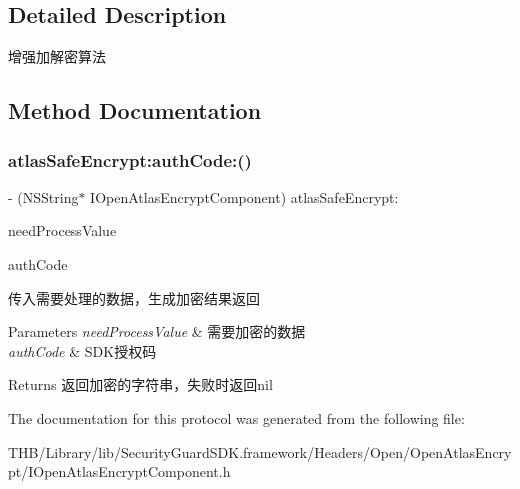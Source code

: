 \subsection{Detailed Description}
增强加解密算法 

\subsection{Method Documentation}
\mbox{\label{protocol_i_open_atlas_encrypt_component_01-p_a04c89f6ec9e95172f1bd3ee2ab100a72}} 
\subsubsection{\texorpdfstring{atlas\+Safe\+Encrypt\+:auth\+Code\+:()}{atlasSafeEncrypt:authCode:()}}
{\footnotesize\ttfamily -\/ (N\+S\+String$\ast$ I\+Open\+Atlas\+Encrypt\+Component) atlas\+Safe\+Encrypt\+: \begin{DoxyParamCaption}\item[{(N\+S\+String $\ast$)}]{need\+Process\+Value }\item[{authCode:(N\+S\+String $\ast$)}]{auth\+Code }\end{DoxyParamCaption}}

传入需要处理的数据，生成加密结果返回


\begin{DoxyParams}{Parameters}
{\em need\+Process\+Value} & 需要加密的数据\\
\hline
{\em auth\+Code} & S\+D\+K授权码\\
\hline
\end{DoxyParams}
\begin{DoxyReturn}{Returns}
返回加密的字符串，失败时返回nil 
\end{DoxyReturn}


The documentation for this protocol was generated from the following file\+:\begin{DoxyCompactItemize}
\item 
T\+H\+B/\+Library/lib/\+Security\+Guard\+S\+D\+K.\+framework/\+Headers/\+Open/\+Open\+Atlas\+Encrypt/I\+Open\+Atlas\+Encrypt\+Component.\+h\end{DoxyCompactItemize}
